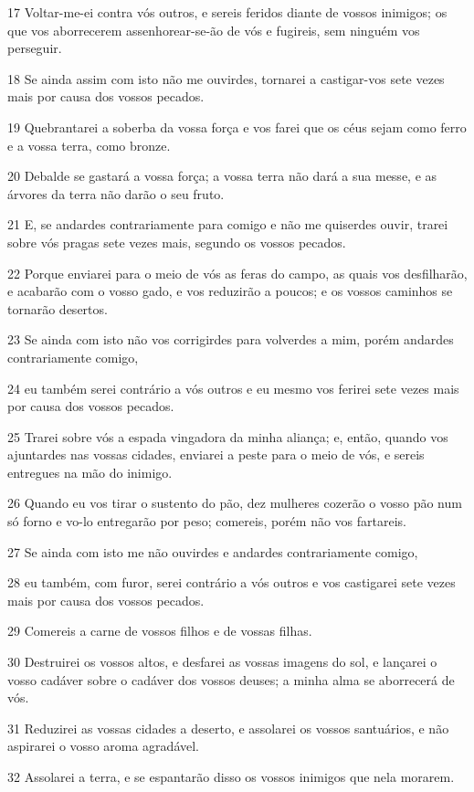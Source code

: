 \par 17 Voltar-me-ei contra vós outros, e sereis feridos diante de vossos inimigos; os que vos aborrecerem assenhorear-se-ão de vós e fugireis, sem ninguém vos perseguir.
\par 18 Se ainda assim com isto não me ouvirdes, tornarei a castigar-vos sete vezes mais por causa dos vossos pecados.
\par 19 Quebrantarei a soberba da vossa força e vos farei que os céus sejam como ferro e a vossa terra, como bronze.
\par 20 Debalde se gastará a vossa força; a vossa terra não dará a sua messe, e as árvores da terra não darão o seu fruto.
\par 21 E, se andardes contrariamente para comigo e não me quiserdes ouvir, trarei sobre vós pragas sete vezes mais, segundo os vossos pecados.
\par 22 Porque enviarei para o meio de vós as feras do campo, as quais vos desfilharão, e acabarão com o vosso gado, e vos reduzirão a poucos; e os vossos caminhos se tornarão desertos.
\par 23 Se ainda com isto não vos corrigirdes para volverdes a mim, porém andardes contrariamente comigo,
\par 24 eu também serei contrário a vós outros e eu mesmo vos ferirei sete vezes mais por causa dos vossos pecados.
\par 25 Trarei sobre vós a espada vingadora da minha aliança; e, então, quando vos ajuntardes nas vossas cidades, enviarei a peste para o meio de vós, e sereis entregues na mão do inimigo.
\par 26 Quando eu vos tirar o sustento do pão, dez mulheres cozerão o vosso pão num só forno e vo-lo entregarão por peso; comereis, porém não vos fartareis.
\par 27 Se ainda com isto me não ouvirdes e andardes contrariamente comigo,
\par 28 eu também, com furor, serei contrário a vós outros e vos castigarei sete vezes mais por causa dos vossos pecados.
\par 29 Comereis a carne de vossos filhos e de vossas filhas.
\par 30 Destruirei os vossos altos, e desfarei as vossas imagens do sol, e lançarei o vosso cadáver sobre o cadáver dos vossos deuses; a minha alma se aborrecerá de vós.
\par 31 Reduzirei as vossas cidades a deserto, e assolarei os vossos santuários, e não aspirarei o vosso aroma agradável.
\par 32 Assolarei a terra, e se espantarão disso os vossos inimigos que nela morarem.
